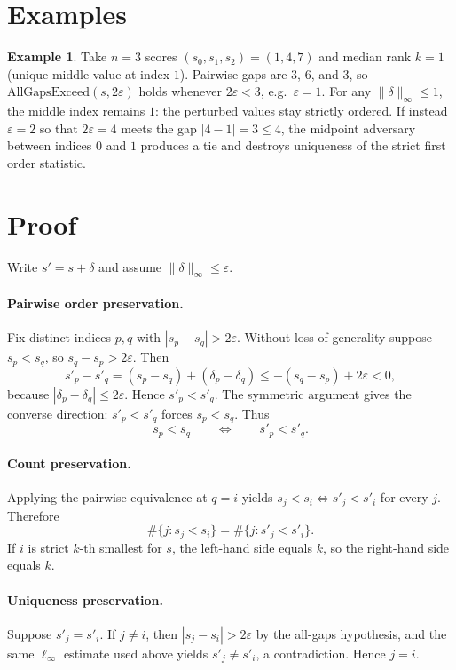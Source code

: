\documentclass[12pt]{article}
\theoremstyle{plain}
\theoremstyle{definition}
\newtheorem{example}[theorem]{Example}
\theoremstyle{remark}
\begin{document}
\section{Examples}
\begin{example}
Take $n=3$ scores $(s_0,s_1,s_2)=(1,4,7)$ and median rank $k=1$ (unique middle value at index $1$). Pairwise gaps are $3$, $6$, and $3$, so $\mathrm{AllGapsExceed}(s,2\varepsilon)$ holds whenever $2\varepsilon<3$, e.g.\ $\varepsilon=1$. For any $\|\delta\|_\infty\le 1$, the middle index remains $1$: the perturbed values stay strictly ordered. If instead $\varepsilon=2$ so that $2\varepsilon=4$ meets the gap $|4-1|=3\le 4$, the midpoint adversary between indices $0$ and $1$ produces a tie and destroys uniqueness of the strict first order statistic.
\end{example}

\section{Proof}
Write $s'=s+\delta$ and assume $\|\delta\|_\infty\le\varepsilon$.

\paragraph{Pairwise order preservation.}
Fix distinct indices $p,q$ with $|s_p-s_q|>2\varepsilon$. Without loss of generality suppose $s_p<s_q$, so $s_q-s_p>2\varepsilon$. Then
\[
s'_p-s'_q
=
(s_p-s_q)+(\delta_p-\delta_q)
\le
-(s_q-s_p)+2\varepsilon
<
0,
\]
because $|\delta_p-\delta_q|\le 2\varepsilon$. Hence $s'_p<s'_q$. The symmetric argument gives the converse direction: $s'_p<s'_q$ forces $s_p<s_q$. Thus
\[
s_p<s_q\qquad\Longleftrightarrow\qquad s'_p<s'_q.
\]

\paragraph{Count preservation.}
Applying the pairwise equivalence at $q=i$ yields $s_j<s_i\Leftrightarrow s'_j<s'_i$ for every $j$. Therefore
\[
\#\{j:s_j<s_i\}
=
\#\{j:s'_j<s'_i\}.
\]
If $i$ is strict $k$-th smallest for $s$, the left-hand side equals $k$, so the right-hand side equals $k$.

\paragraph{Uniqueness preservation.}
Suppose $s'_j=s'_i$. If $j\neq i$, then $|s_j-s_i|>2\varepsilon$ by the all-gaps hypothesis, and the same $\ell_\infty$ estimate used above yields $s'_j\neq s'_i$, a contradiction. Hence $j=i$.
\end{document}
